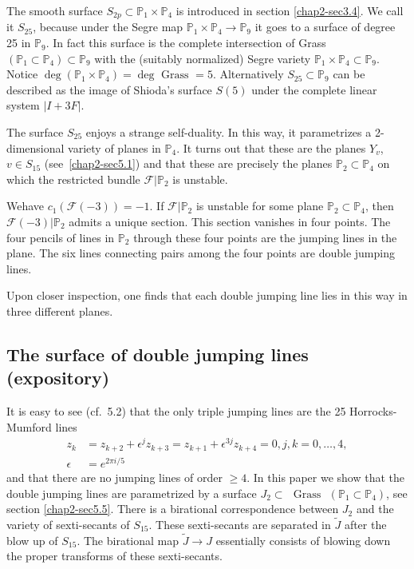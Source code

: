 The smooth surface $S_{2p}\subset \mathbb{P}_{1}\times \mathbb{P}_{4}$
is introduced in section \ref{chap2-sec3.4}. We call it $S_{25}$,
because under the Segre map
$\mathbb{P}_{1}\times \mathbb{P}_{4}\to \mathbb{P}_{9}$ it goes to a
surface of degree 25 in $\mathbb{P}_{9}$. In fact this surface is the
complete intersection of Grass
$(\mathbb{P}_{1}\subset \mathbb{P}_{4})\subset \mathbb{P}_{9}$ with
the (suitably normalized) Segre variety
$\mathbb{P}_{1}\times \mathbb{P}_{4}\subset \mathbb{P}_{9}$. Notice
$\deg(\mathbb{P}_{1}\times \mathbb{P}_{4})=\deg \text{~Grass~}=5$. Alternatively
$S_{25}\subset\mathbb{P}_{9}$ can be described as the image of
Shioda's surface $S(5)$ under the complete linear system $|I+3F|$.

The surface $S_{25}$ enjoys a strange self-duality. In this way, it
para\-metrizes a 2-dimensional variety of planes in $\mathbb{P}_{4}$. It
turns out that these are the planes $Y_{v}$, $v\in S_{15}$
(see~\ref{chap2-sec5.1}) and that these are precisely the planes
$\mathbb{P}_{2}\subset \mathbb{P}_{4}$ on which the restricted bundle
$\mathscr{F}|\mathbb{P}_{2}$ is unstable. 

We\pageoriginale have $c_{1}(\mathscr{F}(-3))=-1$. If
$\mathscr{F}|\mathbb{P}_{2}$ is unstable for some plane
$\mathbb{P}_{2}\subset \mathbb{P}_{4}$, then
$\mathscr{F}(-3)|\mathbb{P}_{2}$ admits a unique section. This section
vanishes in four points. The four pencils of lines in $\mathbb{P}_{2}$
through these four points are the jumping lines in the plane. The six
lines connecting pairs among the four points are double jumping
lines.

Upon closer inspection, one finds that each double jumping line lies
in this way in three different planes.

\subsection{The surface of double jumping lines
(expository)}\label{chap2-sec1.3}

It is easy to see (cf.~5.2) that the only triple jumping lines are the
25 Horrocks-Mumford lines \cite[p.~72]{chap2-key6}
\begin{align*}
z_{k} &=
z_{k+2}+\epsilon^{j}z_{k+3}=z_{k+1}+\epsilon^{3j}z_{k+4}=0, j,
k=0,\ldots,4,\\
\epsilon &= e^{2\pi i/5}
\end{align*}
and that there are no jumping lines of order $\geq 4$. In this paper
we show that the double jumping lines are parametrized by a surface
$J_{2}\subset\text{~ Grass~ } (\mathbb{P}_{1}\subset \mathbb{P}_{4})$,
see section \ref{chap2-sec5.5}. There is a birational correspondence
between $J_{2}$ and the variety of sexti-secants of $S_{15}$. These
sexti-secants are separated in $\widetilde{J}$ after the blow up of
$S_{15}$. The birational map $\widetilde{J}\to J$ essentially consists
of blowing down the proper transforms of these sexti-secants. 

